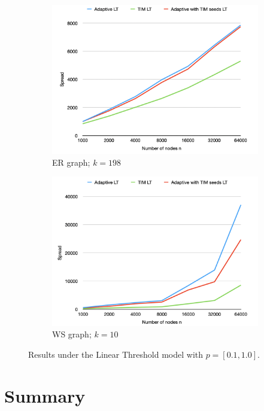 \begin{figure}
\centering
\begin{subfigure}{0.4\textwidth}
    \includegraphics[width=1\linewidth]{GSSI_thesisProposal/figures/ER_LT.png}
    \caption{ER graph; $k=198$}
    \label{fig:first_LT}
\end{subfigure}
\hfill
\begin{subfigure}{0.4\textwidth}
    \includegraphics[width=1\linewidth]{GSSI_thesisProposal/figures/WS_LT.png}
    \caption{WS graph; $k=10$}
    \label{fig:second_LT}
\end{subfigure}
\caption{Results under the Linear Threshold model with $p=[0.1,1.0]$.}
\label{fig:figure_LT}
\end{figure}


\section{Summary}\label{sec_future_0}

